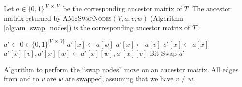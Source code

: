 \begin{theorem}
    \label{theo:swap_nodes_correctness}
    Let $a \in \{0,1\}^{|V| \times |V|}$ be the corresponding ancestor matrix of $T$. The ancestor matrix returned by \textsc{AM::SwapNodes}$(V, a, v, w)$ (Algorithm \ref{alg:am_swap_nodes}) is the corresponding ancestor matrix of $T'$.
\end{theorem}

\begin{algorithm}
    \begin{algorithmic}[1]
            \State $a' \leftarrow 0 \in \{0,1\}^{|V| \times |V|}$
                    \State $a'[x] \leftarrow a[w]$
                    \State $a'[x] \leftarrow a[v]$
                \Else
                    \State $a'[x] \leftarrow a[x]$
                \EndIf
                \State $a'[x][v], a'[x][w] \leftarrow a'[x][w], a'[x][v]$ \Comment Bit Swap
            \EndFor
            \State \Return $a'$
        \EndFunction
    \end{algorithmic}
    \caption{Algorithm to perform the ``swap nodes'' move on an ancestor matrix. All edges from and to $v$ are $w$ are swapped, assuming that we have $v \neq w$.}
    \label{alg:am_swap_nodes}
\end{algorithm}

